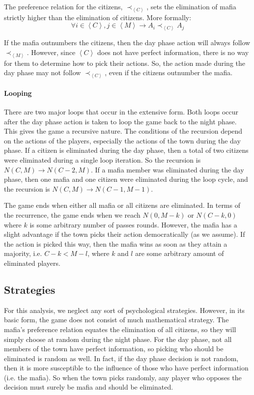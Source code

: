 \documentclass[12pt]{article}
\begin{document}
The preference relation for the citizens, $\prec_{\left<C\right>}$, sets the elimination of mafia strictly higher than the elimination of citizens. More formally: 
\begin{equation}
\forall i \in \left<C\right>, j \in \left<M\right> \rightarrow A_i \prec_{\left<C\right>} A_j
\end{equation}

If the mafia outnumbers the citizens, then the day phase action will always follow $\prec_{\left<M\right>}$. However, since $\left<C\right>$ does not have perfect information, there is no way for them to determine how to pick their actions. So, the action made during the day phase may not follow $\prec_{\left<C\right>}$, even if the citizens outnumber the mafia.

\paragraph{Looping}
There are two major loops that occur in the extensive form. Both loops occur after the day phase action is taken to loop the game back to the night phase. This gives the game a recursive nature. The conditions of the recursion depend on the actions of the players, especially the actions of the town during the day phase. If a citizen is eliminated during the day phase, then a total of two citizens were eliminated during a single loop iteration. So the recursion is $N\left(C,M\right) \rightarrow N\left(C-2,M\right)$. If a mafia member was eliminated during the day phase, then one mafia and one citizen were eliminated during the loop cycle, and the recursion is $N\left(C,M\right) \rightarrow N\left(C-1,M-1\right)$.

The game ends when either all mafia or all citizens are eliminated. In terms of the recurrence, the game ends when we reach $N\left(0,M-k\right)$ or $N\left(C-k,0\right)$ where $k$ is some arbitrary number of passes rounds. However, the mafia has a slight advantage if the town picks their action democratically (as we assume). If the action is picked this way, then the mafia wins as soon as they attain a majority, i.e. $C-k<M-l$, where $k$ and $l$ are some arbitrary amount of eliminated players.

\subsection{Strategies}

For this analysis, we neglect any sort of psychological strategies. However, in its basic form, the game does not consist of much mathematical strategy. The mafia's preference relation equates the elimination of all citizens, so they will simply choose at random during the night phase. For the day phase, not all members of the town have perfect information, so picking who should be eliminated is random as well. In fact, if the day phase decision is not random, then it is more susceptible to the influence of those who have perfect information (i.e. the mafia). So when the town picks randomly, any player who opposes the decision must surely be mafia and should be eliminated.
\end{document}
